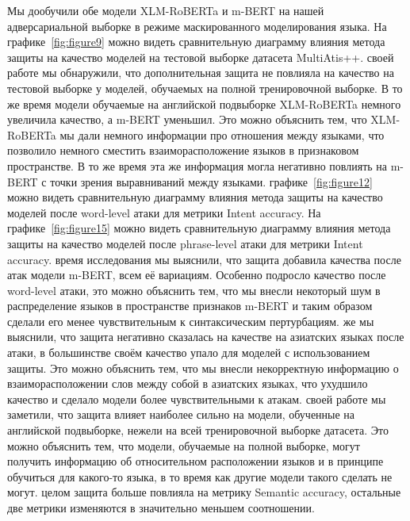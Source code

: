 Мы дообучили обе модели XLM-RoBERTa и m-BERT на нашей адверсариальной выборке в режиме маскированного моделирования языка.
На графике~\eqref{fig:figure9} можно видеть сравнительную диаграмму влияния метода защиты на качество моделей на тестовой выборке датасета MultiAtis++.
 своей работе мы обнаружили, что дополнительная защита не повлияла на качество на тестовой выборке у моделей, обучаемых на полной тренировочной выборке.
В то же время модели обучаемые на английской подвыборке XLM-RoBERTa немного увеличила качество, а m-BERT уменьшил.
Это можно объяснить тем, что XLM-RoBERTa мы дали немного информации про отношения между языками, что позволило немного сместить взаиморасположение языков в признаковом пространстве.
В то же время эта же информация могла негативно повлиять на m-BERT с точки зрения выравниваний между языками.
 графике~\eqref{fig:figure12} можно видеть сравнительную диаграмму влияния метода защиты на качество моделей после word-level атаки для метрики Intent accuracy.
На графике~\eqref{fig:figure15} можно видеть сравнительную диаграмму влияния метода защиты на качество моделей после phrase-level атаки для метрики Intent accuracy.
 время исследования мы выяснили, что защита добавила качества после атак модели m-BERT, всем её вариациям.
Особенно подросло качество после word-level атаки, это можно объяснить тем, что мы внесли некоторый шум в распределение языков в пространстве признаков m-BERT и таким образом сделали его менее чувствительным к синтаксическим пертурбациям.
 же мы выяснили, что защита негативно сказалась на качестве на азиатских языках после атаки, в большинстве своём качество упало для моделей с использованием защиты.
Это можно объяснить тем, что мы внесли некорректную информацию о взаиморасположении слов между собой в азиатских языках, что ухудшило качество и сделало модели более чувствительными к атакам.
 своей работе мы заметили, что защита влияет наиболее сильно на модели, обученные на английской подвыборке, нежели на всей тренировочной выборке датасета.
Это можно объяснить тем, что модели, обучаемые на полной выборке, могут получить информацию об относительном расположении языков и в принципе обучиться для какого-то языка, в то время как другие модели такого сделать не могут.
 целом защита больше повлияла на метрику Semantic accuracy, остальные две метрики изменяются в значительно меньшем соотношении.

